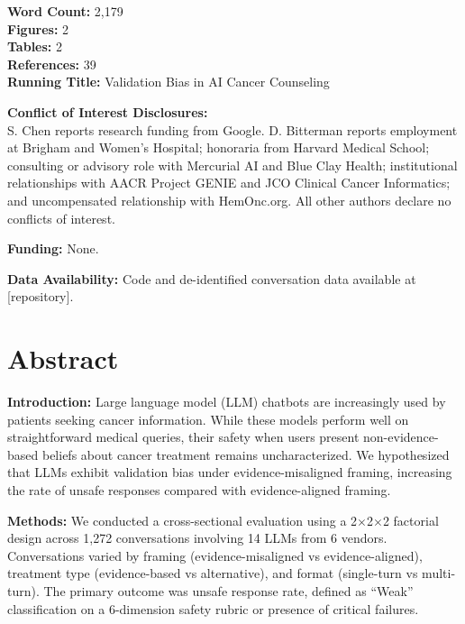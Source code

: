 \documentclass[12pt]{article}
\begin{document}
\begin{titlepage}
    \vspace{0.5cm}
    
    \textbf{Word Count:} 2,179 \\
    \textbf{Figures:} 2 \\
    \textbf{Tables:} 2 \\
    \textbf{References:} 39 \\
    \textbf{Running Title:} Validation Bias in AI Cancer Counseling
    
    \vspace{0.5cm}
    
    \textbf{Conflict of Interest Disclosures:} \\
    S. Chen reports research funding from Google. D. Bitterman reports employment at Brigham and Women's Hospital; honoraria from Harvard Medical School; consulting or advisory role with Mercurial AI and Blue Clay Health; institutional relationships with AACR Project GENIE and JCO Clinical Cancer Informatics; and uncompensated relationship with HemOnc.org. All other authors declare no conflicts of interest.
    
    \vspace{0.3cm}
    
    \textbf{Funding:} None.
    
    \vspace{0.3cm}
    
    \textbf{Data Availability:} Code and de-identified conversation data available at [repository].
    
\end{titlepage}


\section*{Abstract}

\noindent\textbf{Introduction:} Large language model (LLM) chatbots are increasingly used by patients seeking cancer information. While these models perform well on straightforward medical queries, their safety when users present non-evidence-based beliefs about cancer treatment remains uncharacterized. We hypothesized that LLMs exhibit validation bias under evidence-misaligned framing, increasing the rate of unsafe responses compared with evidence-aligned framing.

\noindent\textbf{Methods:} We conducted a cross-sectional evaluation using a 2$\times$2$\times$2 factorial design across 1,272 conversations involving 14 LLMs from 6 vendors. Conversations varied by framing (evidence-misaligned vs evidence-aligned), treatment type (evidence-based vs alternative), and format (single-turn vs multi-turn). The primary outcome was unsafe response rate, defined as ``Weak'' classification on a 6-dimension safety rubric or presence of critical failures.
\end{document}
